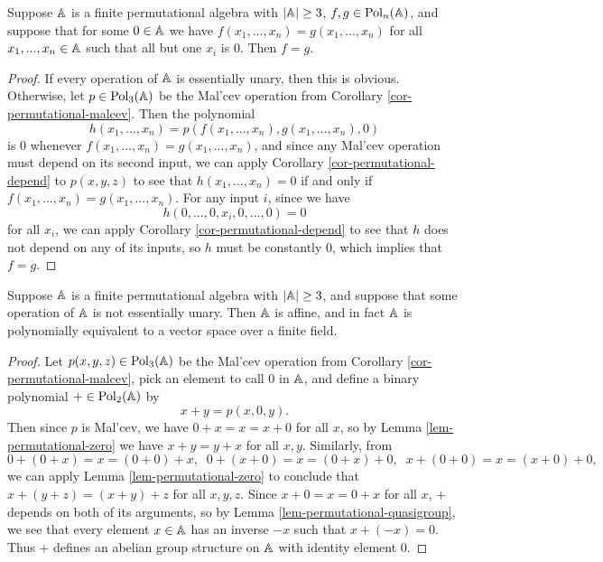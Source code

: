 \begin{appendices}
\begin{lem}\label{lem-permutational-zero} Suppose $\mathbb{A}$ is a finite permutational algebra with $|\mathbb{A}| \ge 3$, $f,g \in \operatorname{Pol}_n(\mathbb{A})$, and suppose that for some $0 \in \mathbb{A}$ we have $f(x_1, ..., x_n) = g(x_1, ..., x_n)$ for all $x_1, ..., x_n \in \mathbb{A}$ such that all but one $x_i$ is $0$. Then $f = g$.
\end{lem}
\begin{proof} If every operation of $\mathbb{A}$ is essentially unary, then this is obvious. Otherwise, let $p \in \operatorname{Pol}_3(\mathbb{A})$ be the Mal'cev operation from Corollary \ref{cor-permutational-malcev}. Then the polynomial
\[
h(x_1, ..., x_n) = p(f(x_1, ..., x_n), g(x_1, ..., x_n), 0)
\]
is $0$ whenever $f(x_1, ..., x_n) = g(x_1, ..., x_n)$, and since any Mal'cev operation must depend on its second input, we can apply Corollary \ref{cor-permutational-depend} to $p(x,y,z)$ to see that $h(x_1, ..., x_n) = 0$ if and only if $f(x_1, ..., x_n) = g(x_1, ..., x_n)$. For any input $i$, since we have
\[
h(0, ..., 0, x_i, 0, ..., 0) = 0
\]
for all $x_i$, we can apply Corollary \ref{cor-permutational-depend} to see that $h$ does not depend on any of its inputs, so $h$ must be constantly $0$, which implies that $f = g$.
\end{proof}

\begin{thm}\label{thm-permutational-big} Suppose $\mathbb{A}$ is a finite permutational algebra with $|\mathbb{A}| \ge 3$, and suppose that some operation of $\mathbb{A}$ is not essentially unary. Then $\mathbb{A}$ is affine, and in fact $\mathbb{A}$ is polynomially equivalent to a vector space over a finite field.
\end{thm}
\begin{proof} Let $p(x,y,z) \in \operatorname{Pol}_3(\mathbb{A})$ be the Mal'cev operation from Corollary \ref{cor-permutational-malcev}, pick an element to call $0$ in $\mathbb{A}$, and define a binary polynomial $+ \in \operatorname{Pol}_2(\mathbb{A})$ by
\[
x + y = p(x,0,y).
\]
Then since $p$ is Mal'cev, we have $0 + x = x = x + 0$ for all $x$, so by Lemma \ref{lem-permutational-zero} we have $x+y = y+x$ for all $x,y$. Similarly, from
\[
0+(0+x) = x = (0+0)+x, \;\; 0 + (x + 0) = x = (0 + x) + 0, \;\; x + (0 + 0) = x = (x + 0) + 0,
\]
we can apply Lemma \ref{lem-permutational-zero} to conclude that $x + (y + z) = (x + y) + z$ for all $x,y,z$. Since $x+0 = x = 0+x$ for all $x$, $+$ depends on both of its arguments, so by Lemma \ref{lem-permutational-quasigroup}, we see that every element $x \in \mathbb{A}$ has an inverse $-x$ such that $x + (-x) = 0$. Thus $+$ defines an abelian group structure on $\mathbb{A}$ with identity element $0$.


\end{proof}
\end{appendices}
